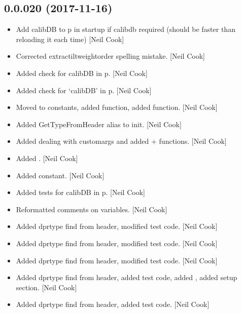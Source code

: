 \documentclass[a4paper,10pt,english]{report}
\begin{document}
\subsection{0.0.020 (2017-11-16)}
\label{\detokenize{misc/changelog:id530}}\begin{itemize}
\item {} 
Add calibDB to p in startup if calibdb required (should be faster than
reloading it each time) {[}Neil Cook{]}

\item {} 
Corrected  extractiltweightorder spelling mistake. {[}Neil Cook{]}

\item {} 
Added check for calibDB in p. {[}Neil Cook{]}

\item {} 
Added check for ‘calibDB’ in p. {[}Neil Cook{]}

\item {} 
Moved  to constants, added 
function, added  function. {[}Neil Cook{]}

\item {} 
Added GetTypeFromHeader alias to init. {[}Neil Cook{]}

\item {} 
Added dealing with customargs and added  +
 functions. {[}Neil Cook{]}

\item {} 
Added . {[}Neil Cook{]}

\item {} 
Added  constant. {[}Neil Cook{]}

\item {} 
Added tests for calibDB in p. {[}Neil Cook{]}

\item {} 
Reformatted comments on variables. {[}Neil Cook{]}

\item {} 
Added dprtype find from header, modified test code. {[}Neil Cook{]}

\item {} 
Added dprtype find from header, modified test code. {[}Neil Cook{]}

\item {} 
Added dprtype find from header, modified test code. {[}Neil Cook{]}

\item {} 
Added dprtype find from header, added test code, added , added
setup section. {[}Neil Cook{]}

\item {} 
Added dprtype find from header, added test code. {[}Neil Cook{]}

\end{itemize}
\end{document}
